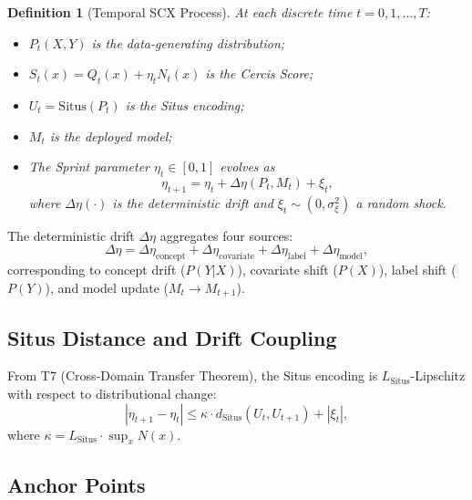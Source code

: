 \documentclass[12pt,a4paper]{article}
\newtheorem{definition}[theorem]{Definition}
\newcommand{\Situs}{\mathrm{Situs}}
\begin{document}
\begin{definition}[Temporal SCX Process]
\label{def:temporal}
At each discrete time $t = 0, 1, \dots, T$:
\begin{itemize}
    \item $P_t(X,Y)$ is the data-generating distribution;
    \item $S_t(x) = Q_t(x) + \eta_t N_t(x)$ is the Cercis Score;
    \item $U_t = \Situs(P_t)$ is the Situs encoding;
    \item $M_t$ is the deployed model;
    \item The Sprint parameter $\eta_t \in [0,1]$ evolves as
          \begin{equation}\label{eq:eta-evolution}
              \eta_{t+1} = \eta_t + \Delta\eta(P_t, M_t) + \xi_t,
          \end{equation}
          where $\Delta\eta(\cdot)$ is the deterministic drift and
          $\xi_t \sim (0, \sigma^2_\xi)$ a random shock.
\end{itemize}
\end{definition}

The deterministic drift $\Delta\eta$ aggregates four sources:
\begin{equation}\label{eq:drift-decomp}
    \Delta\eta = \Delta\eta_{\mathrm{concept}} +
    \Delta\eta_{\mathrm{covariate}} +
    \Delta\eta_{\mathrm{label}} +
    \Delta\eta_{\mathrm{model}},
\end{equation}
corresponding to concept drift ($P(Y|X)$), covariate shift ($P(X)$),
label shift ($P(Y)$), and model update ($M_t \to M_{t+1}$).

\subsection{Situs Distance and Drift Coupling}

From T7 (Cross-Domain Transfer Theorem), the Situs encoding is
$L_{\Situs}$-Lipschitz with respect to distributional change:
\begin{equation}\label{eq:situs-lipschitz}
    |\eta_{t+1} - \eta_t| \leq \kappa \cdot
    d_{\Situs}(U_t, U_{t+1}) + |\xi_t|,
\end{equation}
where $\kappa = L_{\Situs} \cdot \sup_x N(x)$.

\subsection{Anchor Points}
\end{document}

